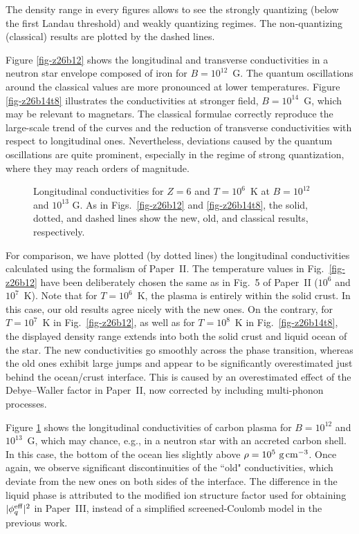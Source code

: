 \documentclass{aa}
\newcommand{\gcc}{\mbox{~g\,cm$^{-3}$}}
\begin{document}
{{The density range in every figures
allows to see the strongly quantizing (below the first
Landau threshold) and weakly quantizing regimes.
The non-quantizing (classical) results
are plotted by the dashed lines.

Figure \ref{fig-z26b12} shows the longitudinal and transverse
conductivities in a neutron star envelope composed
of iron for $B=10^{12}$~G.
The quantum oscillations around the classical
values are more pronounced at lower temperatures.
Figure \ref{fig-z26b14t8} illustrates the conductivities
at stronger field, $B=10^{14}$~G,
which may be relevant to magnetars.
The classical formulae correctly reproduce the
large-scale trend of the curves and the reduction of
transverse conductivities with respect to longitudinal ones.
Nevertheless, deviations caused by the quantum oscillations
are quite prominent, especially in the regime of strong quantization,
where they may reach orders of magnitude.

\begin{figure}
\begin{center}
 \leavevmode
\epsfysize=85mm
\end{center}
\caption[]{Longitudinal conductivities
for $Z=6$ and $T=10^6$~K at $B=10^{12}$ and $10^{13}$ G.
As in Figs.~\protect\ref{fig-z26b12}
and \protect\ref{fig-z26b14t8}, the
solid, dotted, and dashed lines show the new, old,
and classical results, respectively.}
\label{fig-z6t6}
\end{figure}

For comparison, we have plotted (by dotted lines)
the longitudinal conductivities
calculated using the formalism of Paper~II.
The temperature values in Fig.~\ref{fig-z26b12}
have been deliberately chosen
the same as in Fig.~5 of Paper~II ($10^6$ and $10^7$~K).
Note that for $T=10^6$~K,
the plasma is entirely within the solid crust.
In this case, our old results agree nicely with the new ones.
On the contrary,
for $T=10^7$~K in Fig.~\ref{fig-z26b12}, as well as for $T=10^8$~K
in Fig.~\ref{fig-z26b14t8},
the displayed density range extends into both the solid crust and
liquid ocean of the star.
The new conductivities go smoothly across the phase transition,
whereas the old ones exhibit large jumps and appear to be
significantly overestimated just behind the ocean/crust interface.
This is caused by an overestimated effect of the Debye--Waller
factor in Paper~II, now corrected by including
multi-phonon processes.

Figure \ref{fig-z6t6} shows the longitudinal conductivities
of carbon plasma
for $B=10^{12}$ and $10^{13}$~G,
which may chance, e.g., in a neutron star with an accreted carbon shell.
In this case, the bottom of the ocean lies slightly above
$\rho=10^5\gcc$. Once again, we observe significant discontinuities
of the ``old" conductivities, which deviate from the new ones
on both sides of the interface. The difference in the liquid
phase is attributed to the modified ion structure factor used
for obtaining $|\phi_q^{\rm eff}|^2$ in Paper~III,
instead of a simplified screened-Coulomb model
in the previous work.

}}
\end{document}
